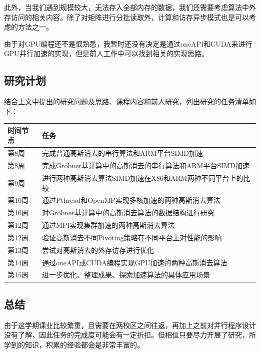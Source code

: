 \documentclass[a4paper]{article}
\begin{document}
此外，当我们遇到规模较大，无法存入全部内存的数据，我们还需要考虑算法中外存访问的相关内容。除了对矩阵进行分批读取外，计算和访存异步模式也是可以考虑的方法之一。

由于对GPU编程还不是很熟悉，我暂时还没有决定是通过oneAPI和CUDA来进行GPU并行加速的实现，但是前人工作中可以找到相关的实现思路。\cite{hojnacki2021parallel}

\subsection{研究计划}
结合上文中提出的研究问题及思路、课程内容和前人研究，列出研究的任务清单如下：
\begin{table}[!htbp]
\centering
\begin{tabular}{@{}ll@{}}
\toprule
时间节点 & 任务                                  \\ \midrule
第8周  & 完成普通高斯消去的串行算法和ARM平台SIMD加速           \\
第8周  & 完成Gröbner基计算中的高斯消去的串行算法和ARM平台SIMD加速 \\
第9周  & 进行两种高斯消去算法SIMD加速在X86和ARM两种不同平台上的比较  \\
第10周 & 通过Pthread和OpenMP实现多核加速的两种高斯消去算法     \\
第10周 & 对Gröbner基计算中的高斯消去算法的数据结构进行研究     \\
第12周 & 通过MPI实现集群加速的两种高斯消去算法                \\
第12周 & 验证高斯消去不同Pivoting策略在不同平台上对性能的影响                \\
第13周 & 尝试对高斯消去的外存访存进行优化                \\
第14周 & 通过oneAPI或CUDA编程实现GPU加速的两种高斯消去算法     \\
第15周 & 进一步优化、整理成果、探索加速算法的具体应用场景                          \\ \bottomrule
\end{tabular}
\end{table}

\subsection{总结}
由于这学期课业比较繁重，且需要在两校区之间往返，再加上之前对并行程序设计没有了解，因此任务的完成度可能会有一定折扣。但相信只要尽力开展了研究，所学到的知识，积累的经验都会是非常丰富的。








\newpage

 
\end{document}
